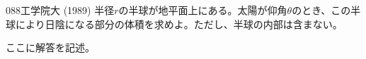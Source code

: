 \begin{prob}{088}{}{工学院大 (1989)}
 半径$r$の半球が地平面上にある。太陽が仰角$\theta$のとき、この半球により日陰になる部分の体積を求めよ。ただし、半球の内部は含まない。
\end{prob}

ここに解答を記述。